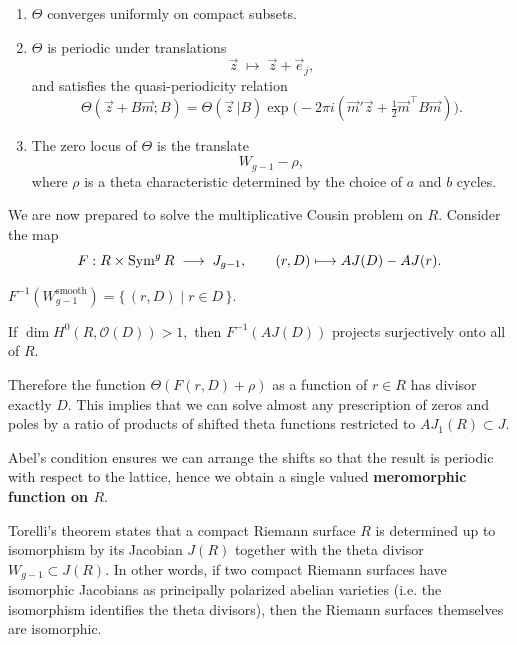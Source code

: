 \documentclass[12pt]{article}
\begin{document}
\begin{theorem}
\leavevmode
\begin{enumerate}[(1)]
    \item $\Theta$ converges uniformly on compact subsets.
    \item $\Theta$ is periodic under translations 
    \[
        \vec{z} \;\longmapsto\; \vec{z} + \vec{e}_j,
    \]
    and satisfies the quasi-periodicity relation
    \[
        \Theta(\vec{z} + B\vec{m}; B)
        =
        \Theta(\vec{z}\,|B)
        \exp\bigl(-2\pi i(\vec{m}'\vec{z} + \tfrac{1}{2}\vec{m}^\top B \vec{m})\bigr).
    \]
    \item The zero locus of $\Theta$ is the translate
    \[
        W_{g-1} - \rho,
    \]
    where $\rho$ is a theta characteristic determined by the choice of $a$ and $b$ cycles.
\end{enumerate}
\end{theorem}




We are now prepared to solve the multiplicative Cousin problem on $R$. Consider the map
\[
F : R \times \operatorname{Sym}^g R \;\longrightarrow\; J_{g-1},
\qquad
(r,D) \longmapsto AJ(D) - AJ(r).
\]

\begin{claim}
\(F^{-1}(W_{g-1}^{\text{smooth}}) = \{\, (r,D) \mid r \in D \,\}.\)
\end{claim}

\begin{remark}
If \(\dim H^0(R, \mathcal{O}(D)) > 1,\)
then \(F^{-1}(AJ(D))\) projects surjectively onto all of \(R.\)
\end{remark}


Therefore the function $\Theta(F(r,D) + \rho)$ as a function of $r \in R$ has divisor exactly $D$. This implies that we can solve almost any prescription of zeros and poles by a ratio of products of shifted theta functions restricted to $AJ_1(R) \subset J$.

Abel's condition ensures we can arrange the shifts so that
the result is periodic with respect to the lattice,
hence we obtain a single valued \textbf{meromorphic function on \(R\)}.

\begin{remark}
    Torelli's theorem states that a compact Riemann surface $R$ is determined up to isomorphism by its Jacobian $J(R)$ together with the theta divisor $W_{g-1} \subset J(R)$. In other words, if two compact Riemann surfaces have isomorphic Jacobians as principally polarized abelian varieties (i.e. the isomorphism identifies the theta divisors), then the Riemann surfaces themselves are isomorphic.
\end{remark}
\end{document}
